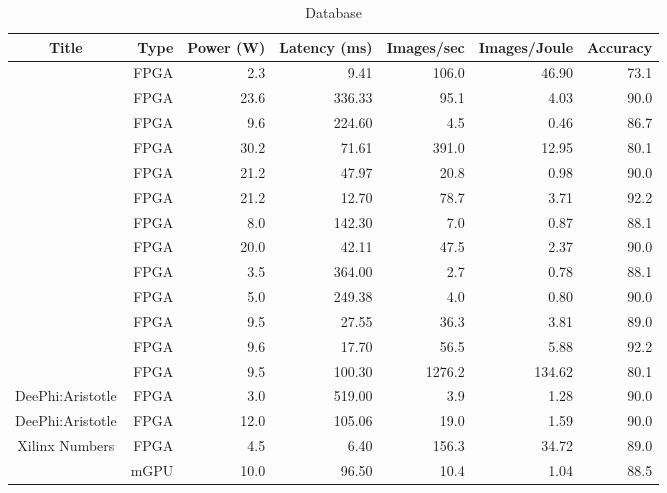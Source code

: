 \documentclass[%
	a4paper,
	twoside
]
{book}
\let\svfigure\figure
\let\svendfigure\endfigure
\renewenvironment{figure}[1][tb]{\svfigure[#1]\setstretch{1}}
{\svendfigure}
\begin{document}
\begin{figure}[htbp]
  \centerline{\scalebox{0.8}{}
    \hfill
    \scalebox{0.8}{}}
   \centerline{\scalebox{0.8}{}
    \hfill
    \scalebox{0.8}{}}
  \caption[]{Solutions for DNN implementations and evaluated with the
    ImageNet dataset as reported in recent publications from 2016-2018 and the
    Xilinx and Nvidia websites accessed in 2018.
    \label{fig:MW-Plots}}
\end{figure}
\begin{table}[ht]
\caption{Database} %
\centering 
\begin{tabular}{c|r|r|r|r|r|r}
\hline
Title & Type & Power (W) & Latency (ms) & Images/sec & Images/Joule & Accuracy\\
\hline
\cite{Jiao2017} & FPGA & 2.3 & 9.41 & 106.0 & 46.90 & 73.1 \\
\cite{Lu2017} & FPGA & 23.6 & 336.33 & 95.1 & 4.03 & 90.0 \\
\cite{Qiu2016} & FPGA & 9.6 & 224.60 & 4.5 & 0.46 & 86.7 \\
\cite{Li2016} & FPGA & 30.2 & 71.61 & 391.0 & 12.95 & 80.1 \\
\cite{Ma2018} & FPGA & 21.2 & 47.97 & 20.8 & 0.98 & 90.0 \\
\cite{Ma2018} & FPGA & 21.2 & 12.70 & 78.7 & 3.71 & 92.2 \\
\cite{Podili2017} & FPGA & 8.0 & 142.30 & 7.0 & 0.87 & 88.1 \\
\cite{Yu2017a} & FPGA & 20.0 & 42.11 & 47.5 & 2.37 & 90.0 \\
\cite{Guo2018} & FPGA & 3.5 & 364.00 & 2.7 & 0.78 & 88.1 \\
\cite{Venieris2016} & FPGA & 5.0 & 249.38 & 4.0 & 0.80 & 90.0 \\
\cite{Gokhale2017} & FPGA & 9.5 & 27.55 & 36.3 & 3.81 & 89.0 \\
\cite{Gokhale2017} & FPGA & 9.6 & 17.70 & 56.5 & 5.88 & 92.2 \\
\cite{Gokhale2017} & FPGA & 9.5 & 100.30 & 1276.2 & 134.62 & 80.1 \\
DeePhi:Aristotle & FPGA & 3.0 & 519.00 & 3.9 & 1.28 & 90.0 \\
DeePhi:Aristotle & FPGA & 12.0 & 105.06 & 19.0 & 1.59 & 90.0 \\
Xilinx Numbers & FPGA & 4.5 & 6.40 & 156.3 & 34.72 & 89.0 \\
\cite{Guo2018} & mGPU & 10.0 & 96.50 & 10.4 & 1.04 & 88.5 \\

\end{tabular}
\end{table}
\end{document}
